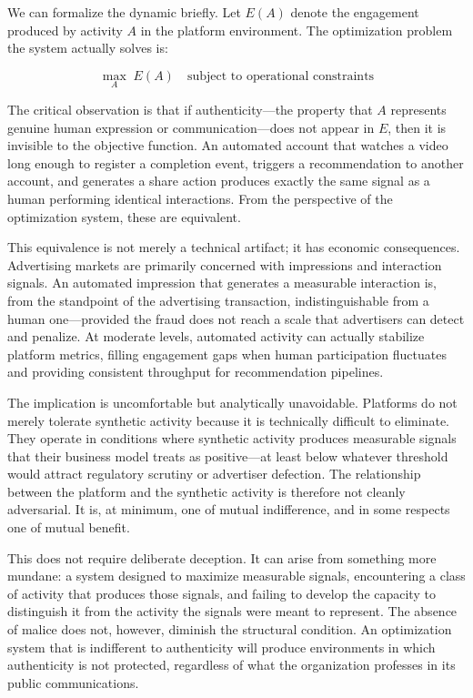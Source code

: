 \documentclass[12pt,a4paper]{article}
\begin{document}
We can formalize the dynamic briefly. Let $E(A)$ denote the engagement produced by activity
$A$ in the platform environment. The optimization problem the system actually solves is:

\begin{equation}
\max_{A} \; E(A) \quad \text{subject to operational constraints}
\end{equation}

The critical observation is that if authenticity---the property that $A$ represents genuine
human expression or communication---does not appear in $E$, then it is invisible to the
objective function. An automated account that watches a video long enough to register a
completion event, triggers a recommendation to another account, and generates a share action
produces exactly the same signal as a human performing identical interactions. From the
perspective of the optimization system, these are equivalent.

This equivalence is not merely a technical artifact; it has economic consequences. Advertising
markets are primarily concerned with impressions and interaction signals. An automated impression
that generates a measurable interaction is, from the standpoint of the advertising transaction,
indistinguishable from a human one---provided the fraud does not reach a scale that advertisers
can detect and penalize. At moderate levels, automated activity can actually stabilize platform
metrics, filling engagement gaps when human participation fluctuates and providing consistent
throughput for recommendation pipelines.

The implication is uncomfortable but analytically unavoidable. Platforms do not merely tolerate
synthetic activity because it is technically difficult to eliminate. They operate in conditions
where synthetic activity produces measurable signals that their business model treats as
positive---at least below whatever threshold would attract regulatory scrutiny or advertiser
defection. The relationship between the platform and the synthetic activity is therefore not
cleanly adversarial. It is, at minimum, one of mutual indifference, and in some respects one
of mutual benefit.

This does not require deliberate deception. It can arise from something more mundane: a system
designed to maximize measurable signals, encountering a class of activity that produces those
signals, and failing to develop the capacity to distinguish it from the activity the signals
were meant to represent. The absence of malice does not, however, diminish the structural
condition. An optimization system that is indifferent to authenticity will produce environments
in which authenticity is not protected, regardless of what the organization professes in its
public communications.
\end{document}
